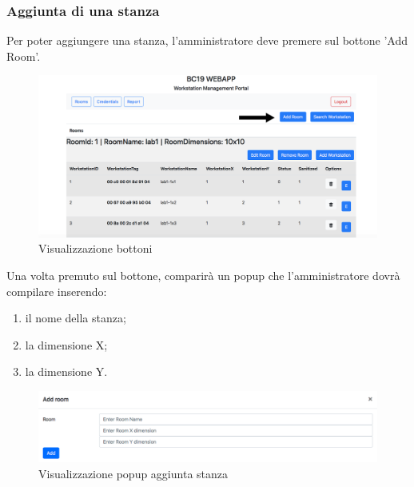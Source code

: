 \subsubsection{Aggiunta di una stanza}
Per poter aggiungere una stanza, l'amministratore deve premere sul bottone 'Add Room'.
\begin{figure}[H]
	\centering
	\includegraphics[width=15cm]{res/images/bottoneAddRoom.png}
	\caption{Visualizzazione bottoni}
\end{figure}
Una volta premuto sul bottone, comparirà un popup che l'amministratore dovrà compilare inserendo:
\begin{enumerate}
	\item il nome della stanza;
	\item la dimensione X;
	\item la dimensione Y.
\end{enumerate}
\begin{figure}[H]
	\centering
	\includegraphics[width=15cm]{res/images/aggiungiStanza1.png}
	\caption{Visualizzazione popup aggiunta stanza}
\end{figure}

